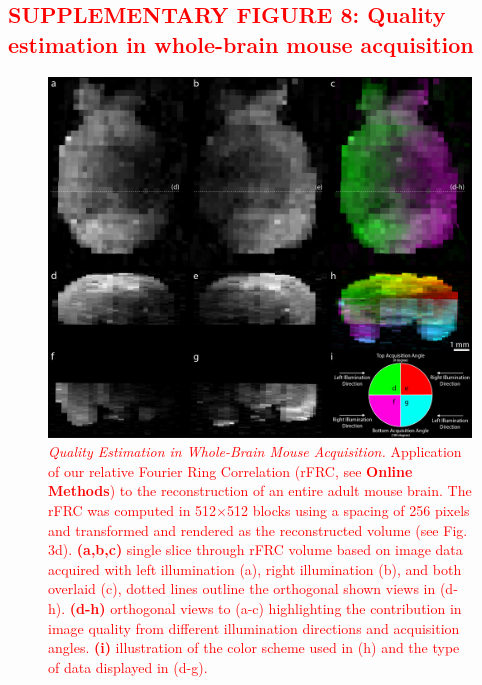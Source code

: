 \documentclass[]{spie}  %
\def\red{\textcolor{red}}
\begin{document}
\subsection*{\red{SUPPLEMENTARY FIGURE 8: Quality estimation in whole-brain mouse acquisition}}
\vspace{1mm}
\begin{figure}[h!]
\includegraphics[width=\textwidth]{rFRC_brain.png}
\vspace{-2.0mm}
\caption{\hspace{-0.5mm} \red{\emph{Quality Estimation in Whole-Brain Mouse Acquisition.} Application of our relative Fourier Ring Correlation (rFRC, see \textbf{Online Methods}) to the reconstruction of an entire adult mouse brain. The rFRC was computed in 512$\times$512 blocks using a spacing of 256 pixels and transformed and rendered as the reconstructed volume (see Fig. 3d). \textbf{(a,b,c)} single slice through rFRC volume based on image data acquired with left illumination (a), right illumination (b), and both overlaid (c), dotted lines outline the orthogonal shown views in (d-h). \textbf{(d-h)} orthogonal views to (a-c) highlighting the contribution in image quality from different illumination directions and acquisition angles. \textbf{(i)} illustration of the color scheme used in (h) and the type of data displayed in (d-g).
}}
\label{fig:sup-rfrc-brain}
\end{figure}

\pagebreak
\end{document}
